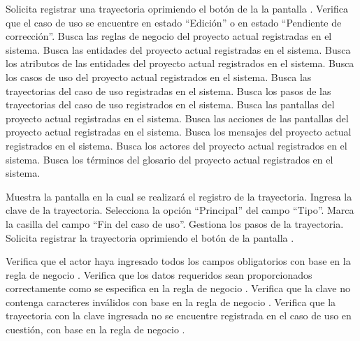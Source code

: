  \begin{UCtrayectoria}
	\UCpaso[\UCactor] Solicita registrar una trayectoria oprimiendo el botón  de la la pantalla .
    \UCpaso[\UCsist] Verifica que el caso de uso se encuentre en estado ``Edición'' o en estado ``Pendiente de corrección''. 
    \UCpaso[\UCsist] Busca las reglas de negocio del proyecto actual registradas en el sistema. 
    \UCpaso[\UCsist] Busca las entidades del proyecto actual registradas en el sistema. 
    \UCpaso[\UCsist] Busca los atributos de las entidades del proyecto actual registrados en el sistema. 
    \UCpaso[\UCsist] Busca los casos de uso del proyecto actual registrados en el sistema. 
    \UCpaso[\UCsist] Busca las trayectorias del caso de uso registradas en el sistema. 
    \UCpaso[\UCsist] Busca los pasos de las trayectorias del caso de uso registrados en el sistema. 
    \UCpaso[\UCsist] Busca las pantallas del proyecto actual registradas en el sistema. 
    \UCpaso[\UCsist] Busca las acciones de las pantallas del proyecto actual registradas en el sistema. 
    \UCpaso[\UCsist] Busca los mensajes del proyecto actual registrados en el sistema. 
    \UCpaso[\UCsist] Busca los actores del proyecto actual registrados en el sistema. 
    \UCpaso[\UCsist] Busca los términos del glosario del proyecto actual registrados en el sistema. 
	
	
	
	\UCpaso[\UCsist] Muestra la pantalla  en la cual se realizará el registro de la trayectoria.
	\UCpaso[\UCactor] Ingresa la clave de la trayectoria.
	\UCpaso[\UCactor] Selecciona la opción ``Principal'' del campo ``Tipo''.  \label{cu5.1.1.1:ingresaDatos}
	\UCpaso[\UCsist] Marca la casilla del campo ``Fin del caso de uso''.
	\UCpaso[\UCactor] Gestiona los pasos de la trayectoria. \label{cu5.1.1.1:gestionaPasos}
	\UCpaso[\UCactor] Solicita registrar la trayectoria oprimiendo el botón  de la pantalla .  
	
	\UCpaso[\UCsist] Verifica que el actor haya ingresado todos los campos obligatorios con base en la regla de negocio . 
	\UCpaso[\UCsist] Verifica que los datos requeridos sean proporcionados correctamente como se especifica en la regla de negocio .  
	\UCpaso[\UCsist] Verifica que la clave no contenga caracteres inválidos con base en la regla de negocio . 
	\UCpaso[\UCsist] Verifica que la trayectoria con la clave ingresada no se encuentre registrada en el caso de uso en cuestión, con base en la regla de negocio . 
	

\end{UCtrayectoria}
